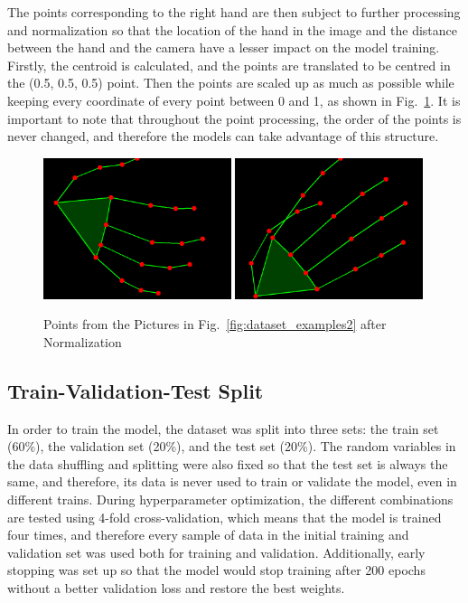 The points corresponding to the right hand are then subject to further processing and normalization so that the location of the hand in the image and the distance between the hand and the camera have a lesser impact on the model training. Firstly, the centroid is calculated, and the points are translated to be centred in the (0.5, 0.5, 0.5) point. Then the points are scaled up as much as possible while keeping every coordinate of every point between 0 and 1, as shown in Fig.~\ref{fig:dataset_examples3}. It is important to note that throughout the point processing, the order of the points is never changed, and therefore the models can take advantage of this structure.

\begin{figure}[H]
    \centerline{\includegraphics[width=0.49\textwidth]{figs/dataset_preprocessing3_1.png} \includegraphics[width=0.49\textwidth]{figs/dataset_preprocessing3_2.png}}
    \caption[Points from the Pictures in Fig.~\ref{fig:dataset_examples2} after Normalization]{Points from the Pictures in Fig.~\ref{fig:dataset_examples2} after Normalization}
    \label{fig:dataset_examples3}
\end{figure}

\subsection{Train-Validation-Test Split}

In order to train the model, the dataset was split into three sets: the train set (60\%), the validation set (20\%), and the test set (20\%). The random variables in the data shuffling and splitting were also fixed so that the test set is always the same, and therefore, its data is never used to train or validate the model, even in different trains. During hyperparameter optimization, the different combinations are tested using 4-fold cross-validation, which means that the model is trained four times, and therefore every sample of data in the initial training and validation set was used both for training and validation. Additionally, early stopping was set up so that the model would stop training after 200 epochs without a better validation loss and restore the best weights.

